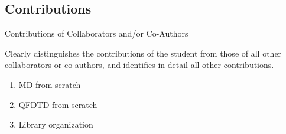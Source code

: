 \subsection{Contributions}
Contributions of Collaborators and/or Co-Authors

Clearly distinguishes the contributions of the student from those of all other collaborators or co-authors, and 
identifies in detail all other contributions.

\begin{enumerate}
\item MD from scratch
\item QFDTD from scratch
\item Library organization
\end{enumerate}





